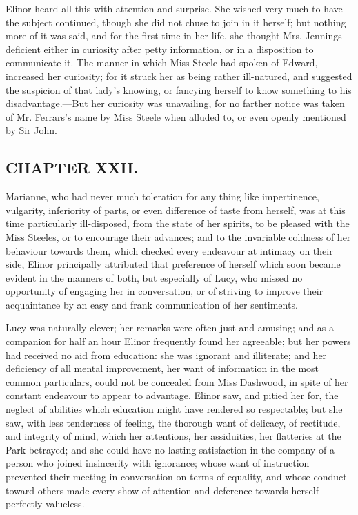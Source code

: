 Elinor heard all this with attention and surprise.  She wished very much to have the subject continued, though she did not chuse to join in it herself; but nothing more of it was said, and for the first time in her life, she thought Mrs. Jennings deficient either in curiosity after petty information, or in a disposition to communicate it. The manner in which Miss Steele had spoken of Edward, increased her curiosity; for it struck her as being rather ill-natured, and suggested the suspicion of that lady's knowing, or fancying herself to know something to his disadvantage.---But her curiosity was unavailing, for no farther notice was taken of Mr. Ferrars's name by Miss Steele when alluded to, or even openly mentioned by Sir John.

\subsection[chapter-xxii.]{\useURL[url22][][][]\from[url22]CHAPTER XXII.}

Marianne, who had never much toleration for any thing like impertinence, vulgarity, inferiority of parts, or even difference of taste from herself, was at this time particularly ill-disposed, from the state of her spirits, to be pleased with the Miss Steeles, or to encourage their advances; and to the invariable coldness of her behaviour towards them, which checked every endeavour at intimacy on their side, Elinor principally attributed that preference of herself which soon became evident in the manners of both, but especially of Lucy, who missed no opportunity of engaging her in conversation, or of striving to improve their acquaintance by an easy and frank communication of her sentiments.

Lucy was naturally clever; her remarks were often just and amusing; and as a companion for half an hour Elinor frequently found her agreeable; but her powers had received no aid from education: she was ignorant and illiterate; and her deficiency of all mental improvement, her want of information in the most common particulars, could not be concealed from Miss Dashwood, in spite of her constant endeavour to appear to advantage. Elinor saw, and pitied her for, the neglect of abilities which education might have rendered so respectable; but she saw, with less tenderness of feeling, the thorough want of delicacy, of rectitude, and integrity of mind, which her attentions, her assiduities, her flatteries at the Park betrayed; and she could have no lasting satisfaction in the company of a person who joined insincerity with ignorance; whose want of instruction prevented their meeting in conversation on terms of equality, and whose conduct toward others made every show of attention and deference towards herself perfectly valueless.

